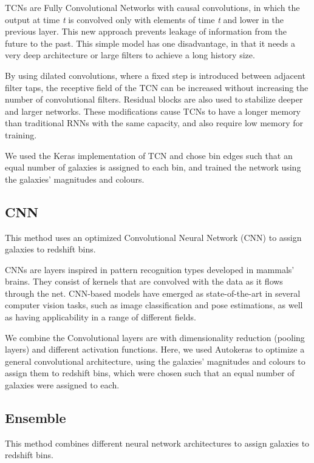 \documentclass[twocolumn,twocolappendix]{aastex63}
\begin{document}
TCNs are Fully Convolutional Networks with causal convolutions, in which the output at time
\textit{t} is convolved only with elements of time \textit{t} and lower in the previous layer. This
new approach prevents leakage of information from the future to the past. This simple model has one
disadvantage, in that it needs a very deep architecture or large filters to achieve a long history
size. 
 
By using dilated convolutions, where a fixed step is introduced between adjacent filter taps, the
receptive field of the TCN can be increased without increasing the number of convolutional filters.
Residual blocks \citep{resnet} are also used to stabilize deeper and larger networks. These
modifications cause TCNs to have a longer memory than traditional RNNs with the same capacity,  and
also require low memory for training.
 
We used the Keras implementation of TCN \citep{kerastcn} and chose bin edges such that an equal
number of galaxies is assigned to each bin, and trained the network using the galaxies' magnitudes
and colours. 

\subsection{ {\sc CNN} } \label{sec:cnn}
This method uses an optimized Convolutional Neural Network (CNN) to assign
galaxies to redshift bins. 
 
CNNs \citep{lecun2015deep} are layers inspired in pattern recognition types developed in mammals' brains.
They consist of kernels that are convolved with the data as it flows through the net. CNN-based
models have emerged as state-of-the-art in several computer vision tasks, such as image
classification and pose estimations, as well as having applicability in a range of different fields.
 
We combine the Convolutional layers are with dimensionality reduction (pooling layers) and different
activation functions. Here, we used Autokeras to optimize a general convolutional architecture,
using the galaxies' magnitudes and colours to assign them to redshift bins, which were chosen such
that an equal number of galaxies were assigned to each.


\subsection{ {\sc Ensemble} } 
\label{ClecioEnsemble} 
This method combines different neural network
architectures to assign galaxies to redshift bins.
 
\end{document}
